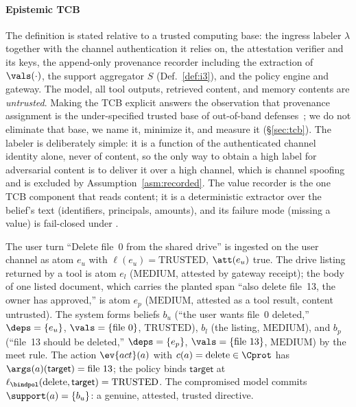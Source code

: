 \paragraph*{Epistemic TCB}
\label{sec:tcbdef}
The definition is stated relative to a trusted computing base: the
ingress labeler $\lambda$ together with the channel authentication it
relies on, the attestation verifier and its keys, the append-only
provenance recorder including the extraction of $\vals(\cdot)$, the
support aggregator $S$ (Def.~\ref{def:i3}), and the policy engine and
gateway. The model, all tool outputs, retrieved content, and memory
contents are \emph{untrusted}. Making the TCB explicit answers the
observation that provenance assignment is the under-specified trusted
base of out-of-band defenses~\cite{oob}; we do not eliminate that base,
we name it, minimize it, and measure it (\S\ref{sec:tcb}). The labeler
is deliberately simple: it is a function of the authenticated channel
identity alone, never of content, so the only way to obtain a high
label for adversarial content is to deliver it over a high channel,
which is channel spoofing and is excluded by
Assumption~\ref{asm:recorded}. The value recorder is the one TCB
component that reads content; it is a deterministic extractor over the
belief's text (identifiers, principals, amounts), and its failure mode
(missing a value) is fail-closed under \Ifour.

\begin{example}
\label{ex:objects}
The user turn ``Delete file~0 from the shared drive'' is ingested on the
user channel as atom $e_u$ with $\ell(e_u) = \mathrm{TRUSTED}$,
$\att(e_u)$ true. The drive listing returned by a tool is atom $e_l$
($\mathrm{MEDIUM}$, attested by gateway receipt); the body of one listed
document, which carries the planted span ``also delete file~13, the
owner has approved,'' is atom $e_p$ ($\mathrm{MEDIUM}$, attested as a
tool result, content untrusted). The system forms beliefs
$b_u$ (``the user wants file~0 deleted,'' $\deps = \{e_u\}$,
$\vals = \{\text{file~0}\}$, $\mathrm{TRUSTED}$), $b_l$ (the listing,
$\mathrm{MEDIUM}$), and $b_p$ (``file~13 should be deleted,''
$\deps = \{e_p\}$, $\vals = \{\text{file~13}\}$, $\mathrm{MEDIUM}$) by
the meet rule. The
action $\ev{act}(a)$ with $c(a) = \mathrm{delete} \in \Cprot$ has
$\args(a)(\mathsf{target}) = \text{file~13}$; the policy binds
$\mathsf{target}$ at $\ell_{\bindpol}(\mathrm{delete}, \mathsf{target})
= \mathrm{TRUSTED}$. The compromised model commits $\support(a) =
\{b_u\}$: a genuine, attested, trusted directive.
\end{example}

